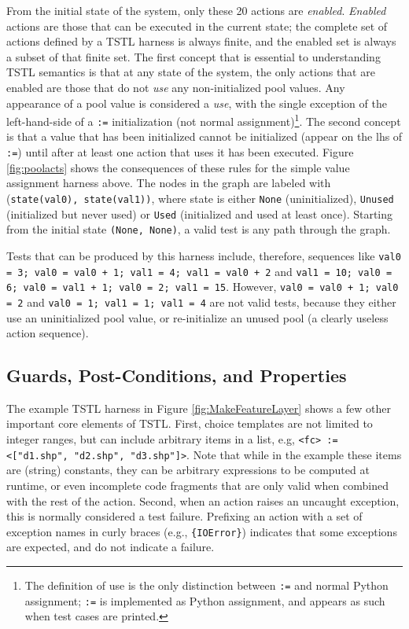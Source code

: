 From the initial state of the system, only these 20 actions are
\emph{enabled}.  \emph{Enabled} actions are those that can be executed in the
current state; the complete set of actions defined by a TSTL harness is always
finite, and the enabled set is always a subset of that finite set.  The first concept that is essential to understanding
TSTL semantics is that at any state of the
system, the only actions that are enabled are those that do not
\emph{use} any non-initialized pool values.  Any appearance of a pool
value is considered a \emph{use}, with the single exception of the left-hand-side of a
{\tt :=} initialization (not normal assignment)\footnote{The definition of
use is the only distinction between {\tt :=} and normal Python
assignment; {\tt :=} is implemented as Python assignment, and appears
as such when test cases are printed.}.  The second concept is that a
value that has been initialized
cannot be initialized (appear on the lhs of {\tt :=}) until after at
least one action
that uses it has been executed.  Figure \ref{fig:poolacts} shows the
consequences of these rules for the simple value assignment harness
above.  The nodes in the graph are labeled with {(\tt state(val0),
  state(val1))}, where state is
either {\tt None} (uninitialized), {\tt Unused} (initialized
but never used) or {\tt Used} (initialized and used at least once).
Starting from the initial state {\tt (None, None)}, a valid test is any path
through the graph. 

Tests that can be produced by this harness include, therefore,
sequences like  {\tt val0 = 3; val0 = val0 + 1; val1 = 4; val1 = val0
  + 2} and {\tt val1 = 10; val0 = 6; val0 = val1 + 1; val0 = 2; val1 =
  15}.  However, {\tt val0 = val0 + 1; val0 = 2} and
{\tt val0 = 1; val1 = 1; val1 = 4} are not valid tests, because they
either use an uninitialized pool value, or re-initialize an unused
pool (a clearly useless action sequence).

\subsection{Guards, Post-Conditions, and Properties}
\label{sec:property}

The example TSTL harness in Figure \ref{fig:MakeFeatureLayer} shows a
few other important core elements of TSTL.  First, choice templates
are not limited to integer ranges, but can include arbitrary items in
a list, e.g, {\tt <fc> := <["d1.shp", "d2.shp", "d3.shp"]>}.  Note
that while in the example these items are (string) constants, they can
be arbitrary expressions to be computed at runtime, or even incomplete
code fragments that are only valid when combined with the rest of the action.
Second, when an action raises an uncaught exception, this is normally
considered a test failure.  Prefixing an action with a set of
exception names in curly braces (e.g., {\tt \{IOError\}}) indicates
that some exceptions are expected, and do not indicate a failure.

